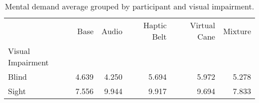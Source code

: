 
\begin{table}[!htb]
\centering
\caption{Mental demand average grouped by participant and visual impairment.}
\label{tab:md_average_group}
\begin{tabular}{lrrrrr}
\toprule
{} &  Base &  Audio &  Haptic Belt &  Virtual Cane &  Mixture \\
Visual Impairment &       &        &              &               &          \\
\midrule
Blind             & 4.639 &  4.250 &        5.694 &         5.972 &    5.278 \\
Sight             & 7.556 &  9.944 &        9.917 &         9.694 &    7.833 \\
\bottomrule
\end{tabular}
\end{table}

